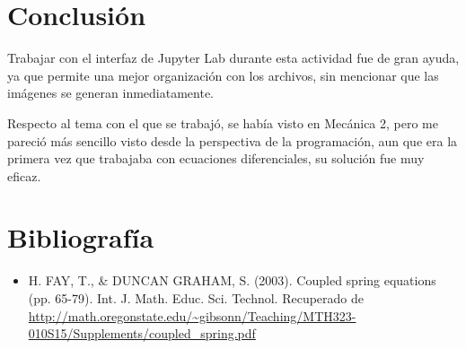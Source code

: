 \documentclass{article}
\begin{document}
\section{Conclusión}
Trabajar con el interfaz de Jupyter Lab durante esta actividad fue de gran ayuda, ya que permite una mejor organización con los archivos, sin mencionar que las imágenes se generan inmediatamente.

Respecto al tema con el que se trabajó, se había visto en Mecánica 2, pero me pareció más sencillo visto desde la perspectiva de la programación, aun que era la primera vez que trabajaba con ecuaciones diferenciales, su solución fue muy eficaz.

\section{Bibliografía}
\begin{itemize}
\item H. FAY, T., \& DUNCAN GRAHAM, S. (2003). Coupled spring equations (pp. 65-79). Int. J. Math. Educ. Sci. Technol. Recuperado de \url{http://math.oregonstate.edu/~gibsonn/Teaching/MTH323-010S15/Supplements/coupled_spring.pdf}
\end{itemize}
\end{document}
